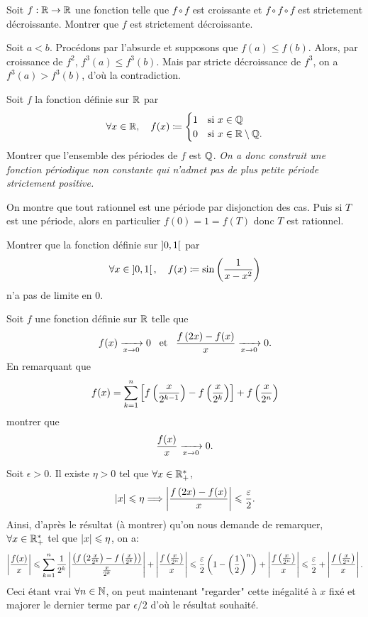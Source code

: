 \documentclass{magnolia}
\begin{document}

Soit $f:\mathbb{R}\to\mathbb{R}$ une fonction telle que $f\circ f$ est croissante et
$f\circ f\circ f$ est strictement décroissante. Montrer que $f$ est
strictement décroissante.

\begin{sol}
Soit $a<b$. Procédons par l'absurde et supposons que $f(a)\leq f(b)$. Alors, par croissance de $f^2$, $f^3(a)\leq f^3(b)$. Mais par stricte décroissance de $f^3$, on a $f^3(a)> f^3(b)$, d'où la contradiction.
\end{sol}



Soit $f$ la fonction définie sur $\mathbb{R}$ par
\[\forall x\in\mathbb{R} ,\quad
  f(x)\coloneqq
  \begin{cases}
  1 & \text{si $x\in\mathbb{Q}$}\\
  0 & \text{si $x\in\mathbb{R}\setminus\mathbb{Q}$.}  
  \end{cases}\]
Montrer que l'ensemble des périodes de $f$ est $\mathbb{Q}$.
\textit{On a donc construit une fonction périodique non constante qui n'admet pas
de plus petite période strictement positive.}

\begin{sol}
On montre que tout rationnel est une période par disjonction des cas. Puis si $T$ est une période, alors en particulier $f(0)=1=f(T)$ donc $T$ est rationnel.
\end{sol}







Montrer que la fonction définie sur $\left]0,1\right[$ par
\[\forall x\in\left]0,1\right[ ,\quad f(x)\coloneqq\sin\left(\frac{1}{x-x^2}\right)\]
n'a pas de limite en 0.

Soit $f$ une fonction définie sur $\mathbb{R}$ telle que
\[f(x)\xrightarrow[x\rightarrow 0]{}0 \quad\!\text{et}\quad\! \frac{f\left(2x\right)-f(x)}{x}\xrightarrow[x\rightarrow 0]{}0.\]
En remarquant que
\[f(x)=\sum_{k=1}^n \left[f\left(\frac{x}{2^{k-1}}\right)-f\left(\frac{x}{2^k}\right)\right] +
  f\left(\frac{x}{2^n}\right)\]
montrer que
\[\frac{f(x)}{x}\xrightarrow[x\rightarrow 0]{}0.\]

\begin{sol}
Soit $\epsilon>0$. Il existe $\eta>0$ tel que $\forall x\in \mathbb{R}_+^*$, $$\left|x\right|\leqslant \eta \Longrightarrow \left|\frac{f\left(2x\right)-f(x)}{x}\right|\leqslant \frac{\varepsilon}{2}.$$
Ainsi, d'après le résultat (à montrer) qu'on nous demande de remarquer, $\forall x \in \mathbb{R}_+^*$ tel que $\left|x\right|\leqslant \eta$, on a:
$$\left|\dfrac{f(x)}{x}\right|\leqslant \sum_{k=1}^n \frac{1}{2^k}\left|\frac{\left(f\left(2\frac{x}{2^{k}}\right)-f\left(\frac{x}{2^k}\right)\right)}{\frac{x}{2^k}}\right| +
  \left|\frac{f\left(\frac{x}{2^n}\right)}{x}\right|\leqslant \frac{\varepsilon}{2}\left(1-\left(\frac{1}{2}\right)^n\right)+\left|\frac{f\left(\frac{x}{2^n}\right)}{x}\right|\leqslant \frac{\varepsilon}{2}+ \left|\frac{f\left(\frac{x}{2^n}\right)}{x}\right|.$$
  Ceci étant vrai $\forall n \in \mathbb{N}$, on peut maintenant "regarder" cette inégalité à $x$ fixé et majorer le dernier terme par $\epsilon/2$ d'où le résultat souhaité.
\end{sol}
\end{document}

